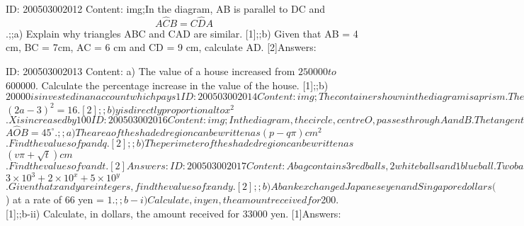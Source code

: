 \documentclass{article}
\begin{document}
ID: 200503002012
Content:
img;In the diagram, AB is parallel to DC and $$A \hat CB = C \hat DA$$.;;a) Explain why triangles ABC and CAD are similar. [1];;b) Given that AB = 4 cm, BC = 7cm, AC = 6 cm and CD = 9 cm, calculate AD. [2]Answers:

ID: 200503002013
Content:
a) The value of a house increased from $250000 to $600000. Calculate the percentage increase in the value of the house. [1];;b) $20000 is invested in an account which pays 1%

ID: 200503002014
Content:
img;The container shown in the diagram is a prism. The cross-section consists of a rectangle and a triangle. The heights of both the rectangle and the triangle is 5 cm. Water is poured into the empty container at a constant rate and fills it in 6 minutes.;;a) After how many minutes will the triangular prism be full? [1];;b) On the axes in the answer space, sketch the graph showing how the depth of the water, d centimeters, in the container varies over the 6 minutes. [2];img;Answers:

ID: 200503002015
Content:
a) Solve the equation $$(2a-3)^{2} =16$$. [2];;b) y is directly proportional to $$x^{2} $$. X is increased by 100%

ID: 200503002016
Content:
img;In the diagram, the circle, centre O, passes through A and B. The tangent at A meets OB produced at C. The radius of the circle is 3 cm and $$A \hat OB=45^{\circ}$$.;;a) The area of the shaded region can be written as $$(p-q \pi) cm^{2} $$. Find the values of p and q. [2];;b) The perimeter of the shaded region can be written as $$(v \pi + \sqrt{t})cm$$. Find the values of v and t. [2]Answers:

ID: 200503002017
Content:
A bag contains 3 red balls, 2 white balls and 1 blue ball. Two balls are taken from the bag at random, without replacement. Find the probability that;;a) both balls are red, [1];;b) the two balls are the same color, [2];;c) the two balls are different colors. [1]Answers:

ID: 200503002018
Content:
a) The number 3002.05 can be written as $$3 \times 10^{3}  + 2 \times 10^{x} + 5 \times 10^{y}$$. Given that x and y are integers, find the values of x and y. [2];;b) A bank exchanged Japanese yen and Singapore dollars ($) at a rate of 66 yen = $1.;;b-i) Calculate, in yen, the amount received for $200. [1];;b-ii) Calculate, in dollars, the amount received for 33000 yen. [1]Answers:
\end{document}
